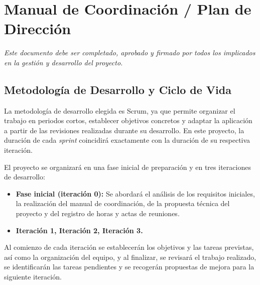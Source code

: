


\section{Manual de Coordinación / Plan de Dirección}

\begin{small}
\textit{Este documento debe ser completado, aprobado y firmado por todos los implicados en la gestión y desarrollo del proyecto.}
\end{small}

\vspace{0.5em}


\subsection{Metodología de Desarrollo y Ciclo de Vida}

La metodología de desarrollo elegida es Scrum, ya que permite organizar el trabajo en periodos cortos, establecer objetivos concretos y adaptar la aplicación a partir de las revisiones realizadas durante su desarrollo. En este proyecto, la duración de cada \textit{sprint} coincidirá exactamente con la duración de su respectiva iteración.

El proyecto se organizará en una fase inicial de preparación y en tres iteraciones de desarrollo:

\begin{itemize}
    \item \textbf{Fase inicial (iteración 0):} Se abordará el análisis de los requisitos iniciales, la realización del manual de coordinación, de la propuesta técnica del proyecto y del registro de horas y actas de reuniones.
    \item \textbf{Iteración 1, Iteración 2, Iteración 3.}
\end{itemize}

Al comienzo de cada iteración se establecerán los objetivos y las tareas previstas, así como la organización del equipo, y al finalizar, se revisará el trabajo realizado, se identificarán las tareas pendientes y se recogerán propuestas de mejora para la siguiente iteración.

